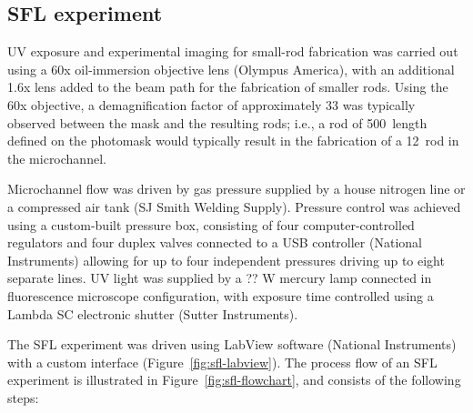 \subsection{SFL experiment}




UV exposure and experimental imaging for small-rod fabrication was carried out using a 60x 
oil-immersion objective lens (Olympus America), with an additional 1.6x lens added to the beam path for
the fabrication of smaller rods.  Using the 60x objective, a demagnification factor of approximately 
33 was typically observed between the mask and the resulting rods; i.e., a rod of 500~\microns length defined on
the photomask would typically result in the fabrication of a 12~\microns rod in the microchannel.

Microchannel flow was driven by gas pressure supplied by a house nitrogen line or a compressed air tank 
(SJ Smith Welding Supply). Pressure control was achieved using a custom-built pressure box, consisting of
four computer-controlled regulators and four duplex valves connected to a USB
controller (National Instruments) allowing for 
up to four independent pressures driving up to eight separate lines. UV light was supplied by a ?? W mercury lamp
connected in fluorescence microscope configuration, with exposure time controlled using a Lambda SC 
electronic shutter (Sutter Instruments).

The SFL experiment was driven using LabView software (National Instruments) with a custom
interface (Figure~\ref{fig:sfl-labview}). The process
flow of an SFL experiment is illustrated in Figure~\ref{fig:sfl-flowchart}, and consists of the following steps:

